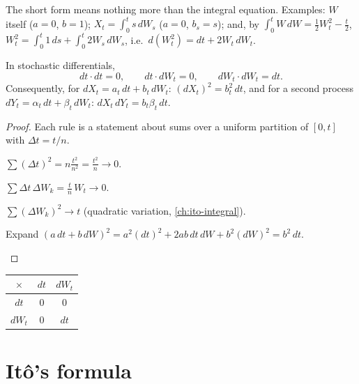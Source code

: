 The short form means nothing more than the integral equation. Examples: $W$ itself ($a=0$, $b=1$); $X_t=\int_0^ts\,dW_s$ ($a=0$, $b_s=s$); and, by $\int_0^tW\,dW=\frac12W_t^2-\frac t2$, $W_t^2=\int_0^t1\,ds+\int_0^t2W_s\,dW_s$, i.e.\ $d(W_t^2)=dt+2W_t\,dW_t$.

\begin{result}
\label{res:table}
In stochastic differentials,
\[
  dt\cdot dt=0,\qquad dt\cdot dW_t=0,\qquad dW_t\cdot dW_t=dt .
\]
Consequently, for $dX_t=a_t\,dt+b_t\,dW_t$: $(dX_t)^2=b_t^2\,dt$, and for a second process $dY_t=\alpha_t\,dt+\beta_t\,dW_t$: $dX_t\,dY_t=b_t\beta_t\,dt$.
\end{result}
\begin{proof}
Each rule is a statement about sums over a uniform partition of $[0,t]$ with $\Delta t=t/n$.
\begin{steps}
  \item $\sum(\Delta t)^2=n\frac{t^2}{n^2}=\frac{t^2}{n}\to0$.
  \item $\sum\Delta t\,\Delta W_k=\frac tn\,W_t\to0$.
  \item $\sum(\Delta W_k)^2\to t$ (quadratic variation, \cref{ch:ito-integral}).
  \item Expand $(a\,dt+b\,dW)^2=a^2(dt)^2+2ab\,dt\,dW+b^2(dW)^2=b^2\,dt$. \qedhere
\end{steps}
\end{proof}

\begin{center}
\renewcommand{\arraystretch}{1.3}
\begin{tabular}{@{}c|cc@{}}
$\times$ & $dt$ & $dW_t$ \\ \hline
$dt$ & $0$ & $0$ \\
$dW_t$ & $0$ & $dt$
\end{tabular}
\end{center}

\section{Itô's formula}


